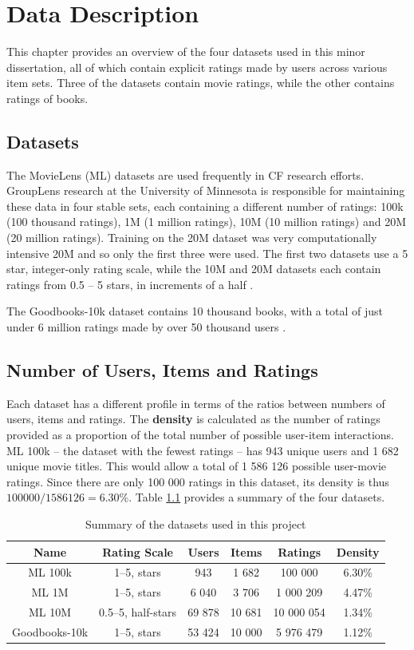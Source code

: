 \chapter{Data Description}
This chapter provides an overview of the four datasets used in this minor dissertation, all of which contain explicit ratings made by users across various item sets. Three of the datasets contain movie ratings, while the other contains ratings of books.

\section{Datasets}
The MovieLens (ML) datasets are used frequently in CF research efforts. GroupLens research at the University of Minnesota is responsible for maintaining these data in four stable sets, each containing a different number of ratings: 100k (100 thousand ratings),  1M (1 million ratings), 10M (10 million ratings) and 20M (20 million ratings).  Training on the 20M dataset was very computationally intensive 20M and so only the first three were used. The first two datasets use a 5 star, integer-only rating scale, while the 10M and 20M datasets each contain ratings from 0.5 -- 5 stars, in increments of a half \parencite{harper2016movielens}.

The Goodbooks-10k dataset contains 10 thousand books, with a total of just under 6 million ratings made by over 50 thousand users \parencite{goodbooks2017}.

\section{Number of Users, Items and Ratings}
Each dataset has a different profile in terms of the ratios between numbers of users, items and ratings. The \textbf{density} is calculated as the number of ratings provided as a proportion of the total number of possible user-item interactions. ML 100k -- the dataset with the fewest ratings -- has 943 unique users and 1 682 unique movie titles. This would allow a total of 1 586 126 possible user-movie ratings. Since there are only 100 000 ratings in this dataset, its density is thus $100000/1586126 = 6.30\%$. Table \ref{tab:data-summary} provides a summary of the four datasets.

\begin{table}[H]
\centering
\begin{tabular}{c | c | c | c | c | c}
\toprule
\textbf{Name} & \textbf{Rating Scale} & \textbf{Users} & \textbf{Items} & \textbf{Ratings} & \textbf{Density} \\
\midrule
ML 100k & 1--5, stars & 943 & 1 682 & 100 000 & 6.30\% \\
ML 1M & 1--5, stars & 6 040 & 3 706 & 1 000 209 & 4.47\% \\
ML 10M & 0.5--5, half-stars & 69 878 & 10 681 & 10 000 054 & 1.34\% \\
Goodbooks-10k & 1--5, stars & 53 424 & 10 000 & 5 976 479 & 1.12\% \\
\bottomrule
\end{tabular}
\caption[Data summary]{Summary of the datasets used in this project}
\label{tab:data-summary}
\end{table}

